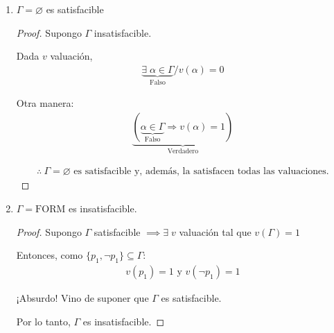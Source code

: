 \begin{enumerate}
\begin{proof}
        \end{proof}

    \item $\Gamma = \varnothing$ es satisfacible


        \begin{proof} \phantom{.}
            
            Supongo $\Gamma$ insatisfacible.

            Dada $v$ valuación, 
            \begin{gather*}
                \underbrace{\exists \; \alpha \in \Gamma}_{\text{Falso}} / 
                v(\alpha)=0
            \end{gather*}

            Otra manera:
            \begin{gather*}
                \underbrace{(\underbrace{\alpha \in \Gamma}_{\text{Falso}} 
                \Rightarrow v(\alpha)=1)}_{\text{Verdadero}}
            \end{gather*}

            \begin{gather*}
                \boxed{\therefore ~ \Gamma = \varnothing \text{ es 
                satisfacible y, además, la satisfacen todas las 
                valuaciones.}}
            \end{gather*}
                
        \end{proof}

    \item $\Gamma = \mathrm{FORM}$ es insatisfacible.

        \begin{proof} \phantom{.}
            
            Supongo $\Gamma$ satisfacible $\implies \exists \; v$ valuación
            tal que $v(\Gamma)=1$

            Entonces, como $\{ p_1, \neg p_1 \} \subseteq \Gamma$:
            \begin{gather*}
                v(p_1)=1 \text{ y } v(\neg p_1)= 1
            \end{gather*}

            ¡Absurdo! Vino de suponer que $\Gamma$ es satisfacible.

            Por lo tanto, $\Gamma$ es insatisfacible.

        \end{proof}
\end{enumerate}

